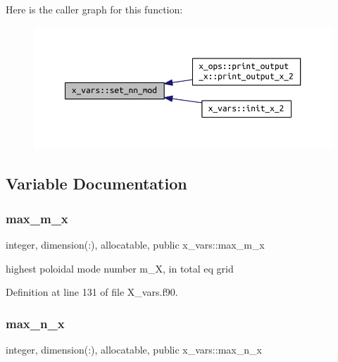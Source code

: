 Here is the caller graph for this function\+:\nopagebreak
\begin{figure}[H]
\begin{center}
\leavevmode
\includegraphics[width=350pt]{namespacex__vars_a90d744aee4358a8cc35d29304d1bb120_icgraph}
\end{center}
\end{figure}


\subsection{Variable Documentation}
\mbox{\label{namespacex__vars_aad66540f255243f66887442b9ef3c745}} 
\subsubsection{\texorpdfstring{max\+\_\+m\+\_\+x}{max\_m\_x}}
{\footnotesize\ttfamily integer, dimension(\+:), allocatable, public x\+\_\+vars\+::max\+\_\+m\+\_\+x}



highest poloidal mode number {\ttfamily m\+\_\+X}, in total eq grid 



Definition at line 131 of file X\+\_\+vars.\+f90.

\mbox{\label{namespacex__vars_a2f04400f8c1489db3f2d66fa972852a5}} 
\subsubsection{\texorpdfstring{max\+\_\+n\+\_\+x}{max\_n\_x}}
{\footnotesize\ttfamily integer, dimension(\+:), allocatable, public x\+\_\+vars\+::max\+\_\+n\+\_\+x}



